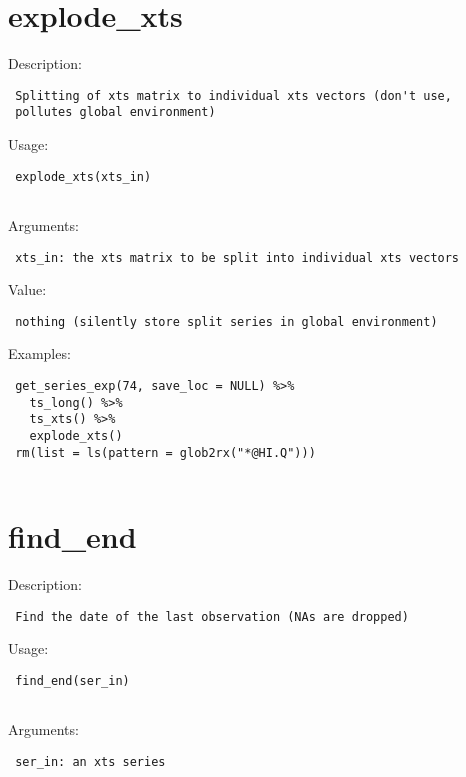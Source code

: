 \documentclass[
  letterpaper,
  DIV=11,
  numbers=noendperiod]{scrreport}
\begin{document}
\hypertarget{explode_xts}{%
\section{explode\_xts}\label{explode_xts}}

Description:

\begin{verbatim}
 Splitting of xts matrix to individual xts vectors (don't use,
 pollutes global environment)
\end{verbatim}

Usage:

\begin{verbatim}
 explode_xts(xts_in)
 
\end{verbatim}

Arguments:

\begin{verbatim}
 xts_in: the xts matrix to be split into individual xts vectors
\end{verbatim}

Value:

\begin{verbatim}
 nothing (silently store split series in global environment)
\end{verbatim}

Examples:

\begin{verbatim}
 get_series_exp(74, save_loc = NULL) %>%
   ts_long() %>%
   ts_xts() %>%
   explode_xts()
 rm(list = ls(pattern = glob2rx("*@HI.Q")))
 
\end{verbatim}

\hypertarget{find_end}{%
\section{find\_end}\label{find_end}}

Description:

\begin{verbatim}
 Find the date of the last observation (NAs are dropped)
\end{verbatim}

Usage:

\begin{verbatim}
 find_end(ser_in)
 
\end{verbatim}

Arguments:

\begin{verbatim}
 ser_in: an xts series
\end{verbatim}
\end{document}
